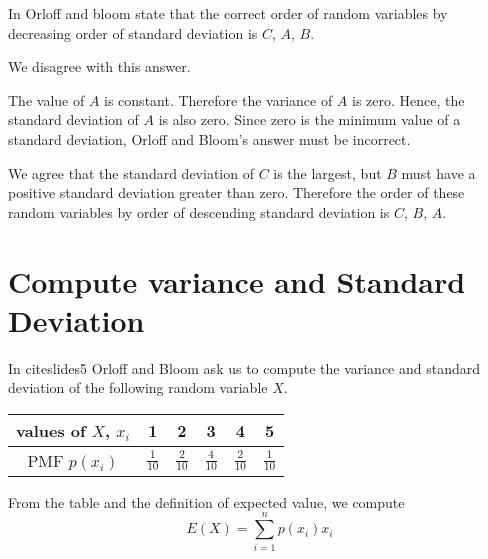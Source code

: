 \documentclass[a4paper,11pt]{article}
\begin{document}

In \cite{slides5Ans} Orloff and bloom state that the correct order of random
variables by decreasing order of standard deviation is $C$, $A$, $B$.

We disagree with this answer.

The value of $A$ is constant.  Therefore the variance of $A$ is zero.  Hence,
the standard deviation of $A$ is also zero.  Since zero is the minimum value
of a standard deviation, Orloff and Bloom's answer must be incorrect.

We agree that the standard deviation of $C$ is the largest, but $B$ must have
a positive standard deviation greater than zero.  Therefore the order of these
random variables by order of descending standard deviation is $C$, $B$, $A$.

\section{Compute variance and Standard Deviation}

In cite{slides5} Orloff and Bloom ask us to compute the variance and standard
deviation of the following random variable $X$.

\begin{center}
\begin{tabular}{ | c | c | c |  c | c | c | }
  \hline
  values of $X$, $x_{i}$ & 1 & 2 & 3 & 4 & 5  \\ \hline
  PMF $p\left( x_i \right)$ & $\frac{1}{10}$ & $\frac{2}{10}$ & $\frac{4}{10}$
    & $\frac{2}{10}$ & $\frac{1}{10}$ \\ \hline
\end{tabular}
\end{center}

From the table and the definition of expected value, we compute
\begin{equation}
    E\left(X \right) =
      \sum_{i=1}^{n} p\left( x_{i} \right) x_i
\end{equation}
\end{document}
